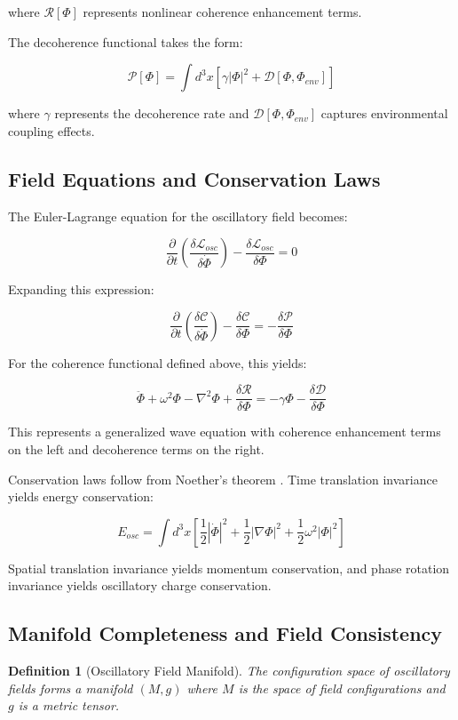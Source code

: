 \documentclass[11pt]{article}
\newtheorem{definition}[theorem]{Definition}
\theoremstyle{remark}
\begin{document}
where $\mathcal{R}[\Phi]$ represents nonlinear coherence enhancement terms.

The decoherence functional takes the form:

$$\mathcal{P}[\Phi] = \int d^3x \left[\gamma|\Phi|^2 + \mathcal{D}[\Phi, \Phi_{env}]\right]$$

where $\gamma$ represents the decoherence rate and $\mathcal{D}[\Phi, \Phi_{env}]$ captures environmental coupling effects.

\subsection{Field Equations and Conservation Laws}

The Euler-Lagrange equation for the oscillatory field becomes:

$$\frac{\partial}{\partial t}\left(\frac{\delta \mathcal{L}_{osc}}{\delta \dot{\Phi}}\right) - \frac{\delta \mathcal{L}_{osc}}{\delta \Phi} = 0$$

Expanding this expression:

$$\frac{\partial}{\partial t}\left(\frac{\delta \mathcal{C}}{\delta \dot{\Phi}}\right) - \frac{\delta \mathcal{C}}{\delta \Phi} = -\frac{\delta \mathcal{P}}{\delta \Phi}$$

For the coherence functional defined above, this yields:

$$\ddot{\Phi} + \omega^2\Phi - \nabla^2\Phi + \frac{\delta \mathcal{R}}{\delta \Phi} = -\gamma\Phi - \frac{\delta \mathcal{D}}{\delta \Phi}$$

This represents a generalized wave equation with coherence enhancement terms on the left and decoherence terms on the right.

Conservation laws follow from Noether's theorem \cite{goldstein2002classical}. Time translation invariance yields energy conservation:

$$E_{osc} = \int d^3x \left[\frac{1}{2}|\dot{\Phi}|^2 + \frac{1}{2}|\nabla\Phi|^2 + \frac{1}{2}\omega^2|\Phi|^2\right]$$

Spatial translation invariance yields momentum conservation, and phase rotation invariance yields oscillatory charge conservation.

\subsection{Manifold Completeness and Field Consistency}

\begin{definition}[Oscillatory Field Manifold]
The configuration space of oscillatory fields forms a manifold $(M, g)$ where $M$ is the space of field configurations and $g$ is a metric tensor.
\end{definition}
\end{document}
